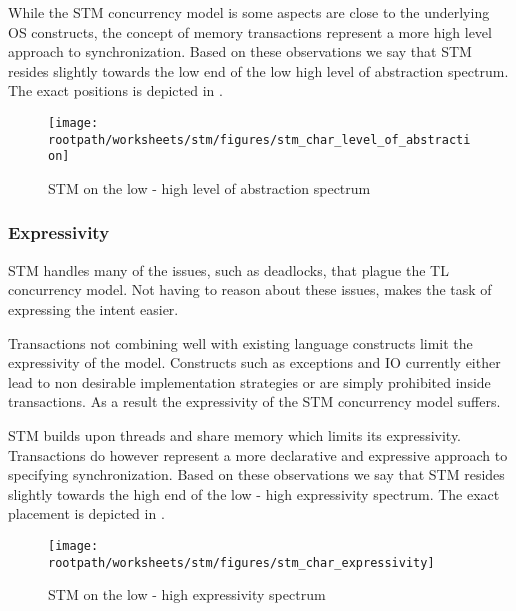 While the \ac{STM} concurrency model is some aspects are close to the underlying \ac{OS} constructs, the concept of memory transactions represent a more high level approach to synchronization. Based on these observations we say that \ac{STM} resides slightly towards the low end of the low high level of abstraction spectrum. The exact positions is depicted in .

\begin{figure}[htbp]
\centering
 \texttt{[image: \\rootpath/worksheets/stm/figures/stm\_char\_level\_of\_abstraction]} 
 \caption{\ac{STM} on the low - high level of abstraction spectrum}
\label{fig:char_stm_level_of_abstraction}
\end{figure}

\subsubsection{Expressivity}\label{sec:stm_expressivity}

\ac{STM} handles many of the issues, such as deadlocks, that plague the \ac{TL} concurrency model. Not having to reason about these issues, makes the task of expressing the intent easier. 

Transactions not combining well with existing language constructs limit the expressivity of the model. Constructs such as exceptions and \ac{IO} currently either lead to non desirable implementation strategies or are simply prohibited inside transactions. As a result the expressivity of the \ac{STM} concurrency model suffers.

\ac{STM} builds upon threads and share memory which limits its expressivity. Transactions do however represent a more declarative and expressive approach to specifying synchronization. Based on these observations we say that \ac{STM} resides slightly towards the high end of the low - high expressivity spectrum. The exact placement is depicted in .

\begin{figure}[htbp]
\centering
 \texttt{[image: \\rootpath/worksheets/stm/figures/stm\_char\_expressivity]} 
 \caption{\ac{STM} on the low - high expressivity spectrum}
\label{fig:char_stm_expressivity}
\end{figure}

